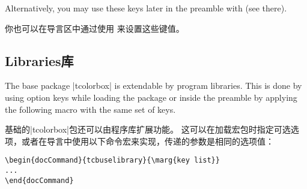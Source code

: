 \begin{dispListing}
\usepackage[listings]{tcolorbox}
\end{dispListing}

Alternatively, you may use these keys later in the preamble with  (see there).

你也可以在导言区中通过使用  来设置这些键值。%





\subsection{Libraries\hfill 库}\label{sec:bibliothek}

The base package |tcolorbox| is extendable by program libraries.%
This is done by using option keys while loading the package or inside
the preamble by applying the following macro with the same set of keys.

基础的|tcolorbox|包还可以由程序库扩展功能。%
这可以在加载宏包时指定可选选项，或者在导言中使用以下命令宏来实现，传递的参数是相同的选项值：

\begin{verbatim}
\begin{docCommand}{tcbuselibrary}{\marg{key list}}
...
\end{docCommand}  
\end{verbatim}




